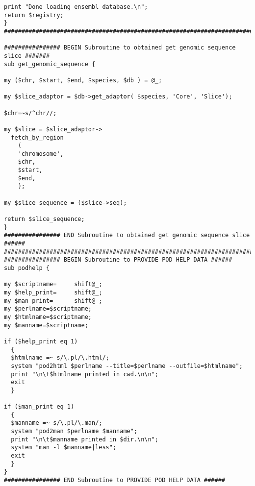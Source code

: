 \begin{lstlisting}
print "Done loading ensembl database.\n";
return $registry;
}
################################################################################

################ BEGIN Subroutine to obtained get genomic sequence slice #######
sub get_genomic_sequence {

my ($chr, $start, $end, $species, $db ) = @_;

my $slice_adaptor = $db->get_adaptor( $species, 'Core', 'Slice');

$chr=~s/^chr//;

my $slice = $slice_adaptor->
  fetch_by_region
    (
    'chromosome',
    $chr,
    $start,
    $end,
    );

my $slice_sequence = ($slice->seq);

return $slice_sequence;
}
################ END Subroutine to obtained get genomic sequence slice ######
################################################################################
################ BEGIN Subroutine to PROVIDE POD HELP DATA ######
sub podhelp {

my $scriptname=		shift@_;
my $help_print=		shift@_;
my $man_print=		shift@_;
my $perlname=$scriptname;
my $htmlname=$scriptname;
my $manname=$scriptname;

if ($help_print eq 1)
  {
  $htmlname =~ s/\.pl/\.html/;
  system "pod2html $perlname --title=$perlname --outfile=$htmlname";
  print "\n\t$htmlname printed in cwd.\n\n";
  exit
  }

if ($man_print eq 1)
  {
  $manname =~ s/\.pl/\.man/;
  system "pod2man $perlname $manname";
  print "\n\t$manname printed in $dir.\n\n";
  system "man -l $manname|less";
  exit
  }
}
################ END Subroutine to PROVIDE POD HELP DATA ######

\end{lstlisting}